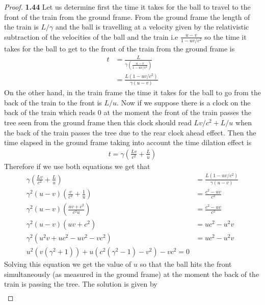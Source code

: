 \documentclass[11pt]{article}
\theoremstyle{definition}
\begin{document}
    \begin{proof}{\textbf{1.44}}
        Let us determine first the time it takes for the ball to travel to the front of
        the train from the ground frame. From the ground frame the length of the
        train is $L/\gamma$ and the ball is travelling at a velocity given by the 
        relativistic subtraction of the velocities of the ball and the train i.e
        $\frac{u-v}{1-uv/c^2}$ so the time it takes for the ball to get to the front of
        the train from the ground frame is
        \begin{align*}
            t &= \frac{L}{\gamma(\frac{u-v}{1-uv/c^2})} \\
              &= \frac{L(1-uv/c^2)}{\gamma(u-v)} 
        \end{align*}
        On the other hand, in the train frame the time it takes for the ball to go from
        the back of the train to the front is $L/u$. Now if we suppose there is a clock
        on the back of the train which reads $0$ at the moment the front of the
        train passes the tree seen from the ground frame then this clock should read
        $Lv/c^2 + L/u$ when the back of the train passes the tree due to the rear clock
        ahead effect. Then the time elapsed in the ground frame taking into account the
        time dilation effect is
        \begin{align*}
            t = \gamma(\frac{Lv}{c^2} + \frac{L}{u})
        \end{align*}
        Therefore if we use both equations we get that
        \begin{align*}
            \gamma(\frac{Lv}{c^2} + \frac{L}{u}) &= \frac{L(1-uv/c^2)}{\gamma(u-v)}\\
            \gamma^2(u-v)(\frac{v}{c^2} + \frac{1}{u}) &= \frac{c^2-uv}{c^2}\\
            \gamma^2(u-v)(\frac{uv+c^2}{c^2u}) &= \frac{c^2-uv}{c^2}\\
            \gamma^2(u-v)(uv+c^2) &= uc^2-u^2v\\
            \gamma^2(u^2v + uc^2-uv^2-vc^2) &= uc^2-u^2v\\
            u^2(v(\gamma^2+1)) + u(c^2(\gamma^2-1) - v^2) - vc^2 = 0
        \end{align*}
        Solving this equation we get the value of $u$ so that the ball
        hits the front simultaneously (as measured in the ground frame) at the moment
        the back of the train is passing the tree. The solution is given by
        \begin{align*}

\end{align*}
\end{proof}
\end{document}
